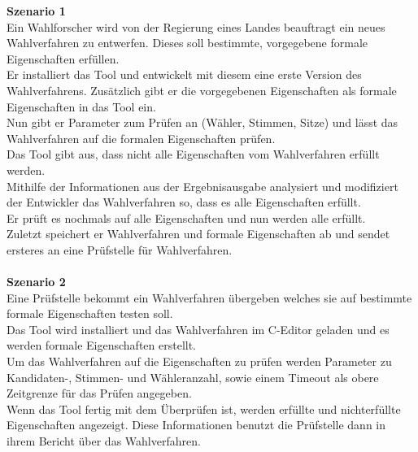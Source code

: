 \documentclass[a4paper]{scrreprt}
\begin{document}
\textbf{Szenario 1}\\
Ein Wahlforscher wird von der Regierung eines Landes beauftragt ein neues Wahlverfahren zu entwerfen. Dieses soll bestimmte, vorgegebene formale Eigenschaften erfüllen.\\
Er installiert das Tool und entwickelt mit diesem eine erste Version des Wahlverfahrens. Zusätzlich gibt er die vorgegebenen Eigenschaften als formale Eigenschaften in das Tool ein.\\
Nun gibt er Parameter zum Prüfen an (Wähler, Stimmen, Sitze) und lässt das Wahlverfahren auf die formalen Eigenschaften prüfen.\\
Das Tool gibt aus, dass nicht alle Eigenschaften vom Wahlverfahren erfüllt werden.\\
Mithilfe der Informationen aus der Ergebnisausgabe analysiert und modifiziert der Entwickler das Wahlverfahren so, dass es alle Eigenschaften erfüllt.\\
Er prüft es nochmals auf alle Eigenschaften und nun werden alle erfüllt.\\
Zuletzt speichert er Wahlverfahren und formale Eigenschaften ab und sendet ersteres an eine Prüfstelle für Wahlverfahren.\\
\\
\textbf{Szenario 2}\\
Eine Prüfstelle bekommt ein Wahlverfahren übergeben welches sie auf bestimmte formale Eigenschaften testen soll.\\
Das Tool wird installiert und das Wahlverfahren im C-Editor geladen und es werden formale Eigenschaften erstellt.\\
Um das Wahlverfahren auf die Eigenschaften zu prüfen werden Parameter zu \\Kandidaten-, Stimmen- und Wähleranzahl, sowie einem Timeout als obere Zeitgrenze für das Prüfen angegeben.\\
Wenn das Tool fertig mit dem Überprüfen ist, werden erfüllte und nichterfüllte Eigenschaften angezeigt. Diese Informationen benutzt die Prüfstelle dann in ihrem Bericht über das Wahlverfahren.
\pagebreak
\end{document}
